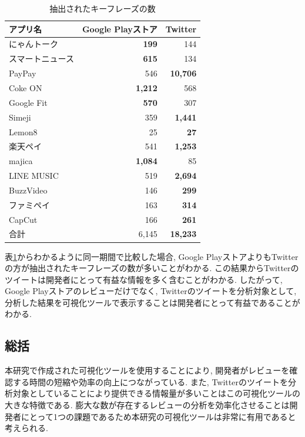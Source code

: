 \begin{table}[H]
  \small
  \caption{抽出されたキーフレーズの数}
  \label{tb:app_count}
  \begin{center}
  \begin{tabularx}{\linewidth}{X|r|r}
    \hline
    アプリ名&Google Playストア&Twitter\\\hline\hline
    にゃんトーク&\textbf{199}&144\\\hline
    スマートニュース&\textbf{615}&134\\\hline
    PayPay&546&\textbf{10,706}\\\hline
    Coke ON&\textbf{1,212}&568\\\hline
    Google Fit&\textbf{570}&307\\\hline
    Simeji&359&\textbf{1,441}\\\hline
    Lemon8&25&\textbf{27}\\\hline
    楽天ペイ&541&\textbf{1,253}\\\hline
    majica&\textbf{1,084}&85\\\hline
    LINE MUSIC&519&\textbf{2,694}\\\hline
    BuzzVideo&146&\textbf{299}\\\hline
    ファミペイ&163&\textbf{314}\\\hline
    CapCut&166&\textbf{261}\\\hline\hline
    合計&6,145&\textbf{18,233}\\\hline
  \end{tabularx}\end{center}
\end{table}

\noindent
表\ref{tb:app_count}からわかるように同一期間で比較した場合, Google PlayストアよりもTwitterの方が抽出されたキーフレーズの数が多いことがわかる. 
この結果からTwitterのツイートは開発者にとって有益な情報を多く含むことがわかる. したがって, Google Playストアのレビューだけでなく, Twitterのツイートを分析対象として, 分析した結果を可視化ツールで表示することは開発者にとって有益であることがわかる. 

\subsection{総括}
本研究で作成された可視化ツールを使用することにより, 開発者がレビューを確認する時間の短縮や効率の向上につながっている. また, Twitterのツイートを分析対象としていることにより提供できる情報量が多いことはこの可視化ツールの大きな特徴である. 
膨大な数が存在するレビューの分析を効率化させることは開発者にとって1つの課題であるため本研究の可視化ツールは非常に有用であると考えられる. 

